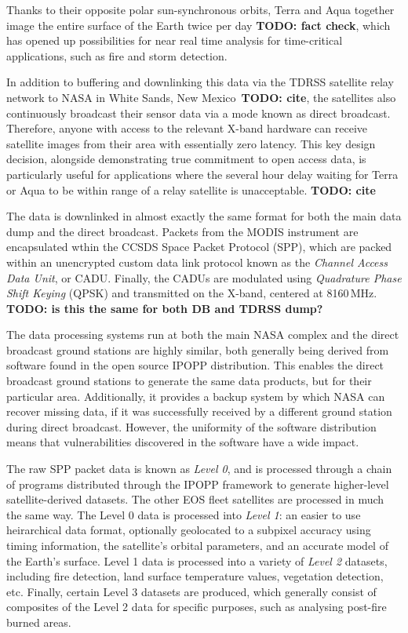 Thanks to their opposite polar sun-synchronous orbits, Terra and Aqua together image the entire surface of the Earth twice per day \textbf{TODO: fact check}, which has opened up possibilities for near real time analysis for time-critical applications, such as fire and storm detection.

In addition to buffering and downlinking this data via the TDRSS satellite relay network to NASA in White Sands, New Mexico~\textbf{TODO: cite}, the satellites also continuously broadcast their sensor data via a mode known as direct broadcast.
Therefore, anyone with access to the relevant X-band hardware can receive satellite images from their area with essentially zero latency.
This key design decision, alongside demonstrating true commitment to open access data, is particularly useful for applications where the several hour delay waiting for Terra or Aqua to be within range of a relay satellite is unacceptable. \textbf{TODO: cite}


The data is downlinked in almost exactly the same format for both the main data dump and the direct broadcast.
Packets from the MODIS instrument are encapsulated wthin the CCSDS Space Packet Protocol (SPP), which are packed within an unencrypted custom data link protocol known as the \textit{Channel Access Data Unit}, or CADU.
Finally, the CADUs are modulated using \textit{Quadrature Phase Shift Keying} (QPSK) and transmitted on the X-band, centered at 8160\,MHz. \textbf{TODO: is this the same for both DB and TDRSS dump?}

The data processing systems run at both the main NASA complex and the direct broadcast ground stations are highly similar, both generally being derived from software found in the open source IPOPP distribution.
This enables the direct broadcast ground stations to generate the same data products, but for their particular area.
Additionally, it provides a backup system by which NASA can recover missing data, if it was successfully received by a different ground station during direct broadcast.
However, the uniformity of the software distribution means that vulnerabilities discovered in the software have a wide impact.

The raw SPP packet data is known as \textit{Level 0}, and is processed through a chain of programs distributed through the IPOPP framework to generate higher-level satellite-derived datasets.
The other EOS fleet satellites are processed in much the same way.
The Level 0 data is processed into \textit{Level 1}: an easier to use heirarchical data format, optionally geolocated to a subpixel accuracy using timing information, the satellite's orbital parameters, and an accurate model of the Earth's surface.
Level 1 data is processed into a variety of \textit{Level 2} datasets, including fire detection, land surface temperature values, vegetation detection, etc.
Finally, certain Level 3 datasets are produced, which generally consist of composites of the Level 2 data for specific purposes, such as analysing post-fire burned areas.

